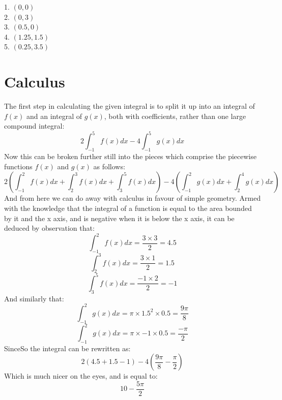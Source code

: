 \documentclass[11pt]{article}
\begin{document}
1. $(0,0)$\\

2. $(0,3)$\\

3. $(0.5,0)$\\

4. $(1.25,1.5)$\\

5. $(0.25,3.5)$\\

\section*{Calculus}
The first step in calculating the given integral is to split it up into an integral of $f(x)$ and an integral of $g(x)$, both with coefficients, rather than one large compound integral:
$$2\int_{-1}^{5} f(x)dx-4\int_{-1}^{5} g(x)dx$$ 
Now this can be broken further still into the pieces which comprise the piecewise functions $f(x)$ and $g(x)$ as follows: 
$$2(\int_{-1}^{2} f(x)dx+\int_{2}^{3} f(x)dx+\int_{3}^{5} f(x)dx)-4(\int_{-1}^{2} g(x)dx + \int_{2}^{4} g(x)dx)$$ 
And from here we can do away with calculus in favour of simple geometry. Armed with the knowledge that the integral of a function is equal to the area bounded by it and the x axis, and is negative when it is below the x axis, it can be deduced by observation that: 
$$\int_{-1}^{2} f(x)dx=\frac{3\times 3}{2}=4.5$$
$$\int_{2}^{3} f(x)dx=\frac{3\times 1}{2}=1.5$$
$$\int_{3}^{5} f(x)dx=\frac{-1\times 2}{2}=-1$$
And similarly that:
$$\int_{-1}^{2} g(x)dx=\pi \times 1.5^2 \times 0.5=\frac{9\pi}{8}$$
$$\int_{-1}^{2} g(x)dx=\pi \times -1 \times 0.5 =\frac{-\pi}{2}$$
SinceSo the integral can be rewritten as:
$$2(4.5+1.5-1)-4(\frac{9\pi}{8}-\frac{\pi}{2})$$
Which is much nicer on the eyes, and is equal to:
$$10-\frac{5\pi}{2}$$
\end{document}
